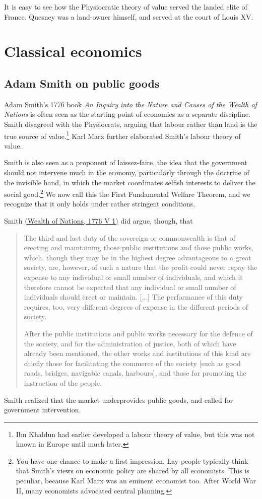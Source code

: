 It is easy to see how the Physiocratic theory of value served the landed elite of France. Quesney was a land-owner himself, and served at the court of Louis XV.

\section{Classical economics}

\subsection{Adam Smith on public goods}
Adam Smith's 1776 book \emph{An Inquiry into the Nature and Causes of the Wealth of Nations} is often seen as the starting point of economics as a separate discipline. Smith disagreed with the Physiocrats, arguing that labour rather than land is the true source of value.\footnote{Ibn Khaldun had earlier developed a labour theory of value, but this was not known in Europe until much later.} Karl Marx further elaborated Smith's labour theory of value.

Smith is also seen as a proponent of laissez-faire, the idea that the government should not intervene much in the economy, particularly through the doctrine of the invisible hand, in which the market coordinates selfish interests to deliver the social good.\footnote{You have one chance to make a first impression. Lay people typically think that Smith's views on economic policy are shared by all economists. This is peculiar, because Karl Marx was an eminent economist too. After World War II, many economists advocated central planning.} We now call this the First Fundamental Welfare Theorem, and we recognize that it only holds under rather stringent conditions.

Smith \href{https://en.wikisource.org/wiki/The_Wealth_of_Nations/Book_V/Chapter_1#Part_3:_Of_the_Expense_of_Public_Works_and_Public_Institutions}{(Wealth of Nations, 1776 V 1)} did argue, though, that
\begin{quote}
    The third and last duty of the sovereign or commonwealth is that of erecting and maintaining those public institutions and those public works, which, though they may be in the highest degree advantageous to a great society, are, however, of such a nature that the profit could never repay the expense to any individual or small number of individuals, and which it therefore cannot be expected that any individual or small number of individuals should erect or maintain. [...] The performance of this duty requires, too, very different degrees of expense in the different periods of society.
    
    After the public institutions and public works necessary for the defence of the society, and for the administration of justice, both of which have already been mentioned, the other works and institutions of this kind are chiefly those for facilitating the commerce of the society [such as good roads, bridges, navigable canals, harbours], and those for promoting the instruction of the people.
\end{quote}
Smith realized that the market underprovides public goods, and called for government intervention.

